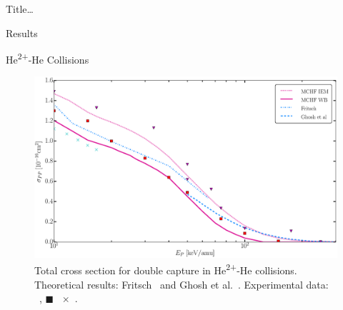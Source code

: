 \documentclass[letterpaper, 11 pt]{report}
\begin{document}
\begin{chapter}{ Title\dots \label{chap:p-he2p-he}}
\begin{section}{Results \label{sec:phe2p-res}}
\begin{subsection}{\texorpdfstring{He\textsuperscript{2+}}{He2+}-He Collisions 
                         \label{sec:he2phe-res}}
         \begin{figure}[h]
            \centering
            \includegraphics[width = 0.95 \linewidth]{./images/he2phe/he2phe-PP.eps}
            \caption[Total cross section for double capture in He\textsuperscript{2+}-He
                     collisions.]{Total cross section for double capture in He\textsuperscript{2+}-He
                     collisions.
                     Theoretical results: Fritsch~\cite{Fritsch-94} and Ghosh
                     et al.~\cite{GDMP-08}.
                     Experimental data: {\color{RedViolet}{$\blacktriangledown$}}~\cite{Dubois87},
                     {\color{red}$\blacksquare$}~\cite{Rudd85}
                     {\color{TealBlue}$\times$}~\cite{SG74}. \label{fig:he2phe-pp}}
         \end{figure}


\end{subsection}
\end{section}
\end{chapter}
\end{document}
